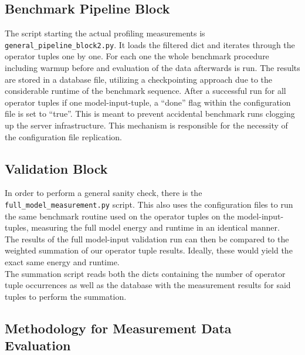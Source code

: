 \documentclass[conference]{IEEEtran}
\begin{document}
\subsection{Benchmark Pipeline Block}
The script starting the actual profiling measurements is \texttt{general\_pipeline\_block2.py}. It loads the filtered dict and iterates through the operator tuples one by one. For each one the whole benchmark procedure including warmup before and evaluation of the data afterwards is run. The results are stored in a database file, utilizing a checkpointing approach due to the considerable runtime of the benchmark sequence. After a successful run for all operator tuples if one model-input-tuple, a “done” flag within the configuration file is set to “true”. This is meant to prevent accidental benchmark runs clogging up the server infrastructure. This mechanism is responsible for the necessity of the configuration file replication. \\

\subsection{Validation Block}
In order to perform a general sanity check, there is the \texttt{full\_model\_measurement.py} script. This also uses the configuration files to run the same benchmark routine used on the operator tuples on the model-input-tuples, measuring the full model energy and runtime in an identical manner. \\
The results of the full model-input validation run can then be compared to the weighted summation of our operator tuple results. Ideally, these would yield the exact same energy and runtime. \\
The summation script reads both the dicts containing the number of operator tuple occurrences as well as the database with the measurement results for said tuples to perform the summation.

\subsection{Methodology for Measurement Data Evaluation}
\end{document}

